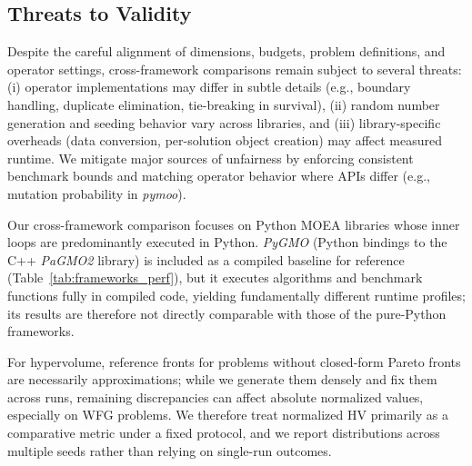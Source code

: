 \documentclass[final,5p,times,twocolumn]{elsarticle}
\newcommand{\VAMOS}{VAMOS}
\begin{document}


\subsection{Threats to Validity}

Despite the careful alignment of dimensions, budgets, problem definitions, and operator settings, cross-framework comparisons remain subject to several threats: (i) operator implementations may differ in subtle details (e.g., boundary handling, duplicate elimination, tie-breaking in survival), (ii) random number generation and seeding behavior vary across libraries, and (iii) library-specific overheads (data conversion, per-solution object creation) may affect measured runtime. We mitigate major sources of unfairness by enforcing consistent benchmark bounds and matching operator behavior where APIs differ (e.g., mutation probability in \textit{pymoo}).


Our cross-framework comparison focuses on Python MOEA libraries whose inner loops are predominantly executed in Python. \textit{PyGMO} (Python bindings to the C++ \textit{PaGMO2} library) is included as a compiled baseline for reference (Table~\ref{tab:frameworks_perf}), but it executes algorithms and benchmark functions fully in compiled code, yielding fundamentally different runtime profiles; its results are therefore not directly comparable with those of the pure-Python frameworks.

For hypervolume, reference fronts for problems without closed-form Pareto fronts are necessarily approximations; while we generate them densely and fix them across runs, remaining discrepancies can affect absolute normalized values, especially on WFG problems. We therefore treat normalized HV primarily as a comparative metric under a fixed protocol, and we report distributions across multiple seeds rather than relying on single-run outcomes.
\end{document}
